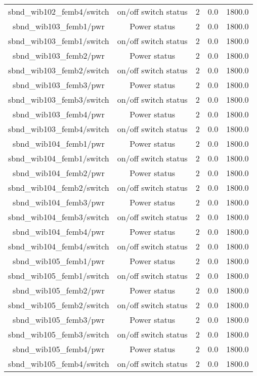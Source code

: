 \begin{center}
\begin{longtable}{c | c c c c }
sbnd\_wib102\_femb4/switch & on/off switch status & 2 & 0.0 & 1800.0\\ 
sbnd\_wib103\_femb1/pwr & Power status & 2 & 0.0 & 1800.0\\ 
sbnd\_wib103\_femb1/switch & on/off switch status & 2 & 0.0 & 1800.0\\ 
sbnd\_wib103\_femb2/pwr & Power status & 2 & 0.0 & 1800.0\\ 
sbnd\_wib103\_femb2/switch & on/off switch status & 2 & 0.0 & 1800.0\\ 
sbnd\_wib103\_femb3/pwr & Power status & 2 & 0.0 & 1800.0\\ 
sbnd\_wib103\_femb3/switch & on/off switch status & 2 & 0.0 & 1800.0\\ 
sbnd\_wib103\_femb4/pwr & Power status & 2 & 0.0 & 1800.0\\ 
sbnd\_wib103\_femb4/switch & on/off switch status & 2 & 0.0 & 1800.0\\ 
sbnd\_wib104\_femb1/pwr & Power status & 2 & 0.0 & 1800.0\\ 
sbnd\_wib104\_femb1/switch & on/off switch status & 2 & 0.0 & 1800.0\\ 
sbnd\_wib104\_femb2/pwr & Power status & 2 & 0.0 & 1800.0\\ 
sbnd\_wib104\_femb2/switch & on/off switch status & 2 & 0.0 & 1800.0\\ 
sbnd\_wib104\_femb3/pwr & Power status & 2 & 0.0 & 1800.0\\ 
sbnd\_wib104\_femb3/switch & on/off switch status & 2 & 0.0 & 1800.0\\ 
sbnd\_wib104\_femb4/pwr & Power status & 2 & 0.0 & 1800.0\\ 
sbnd\_wib104\_femb4/switch & on/off switch status & 2 & 0.0 & 1800.0\\ 
sbnd\_wib105\_femb1/pwr & Power status & 2 & 0.0 & 1800.0\\ 
sbnd\_wib105\_femb1/switch & on/off switch status & 2 & 0.0 & 1800.0\\ 
sbnd\_wib105\_femb2/pwr & Power status & 2 & 0.0 & 1800.0\\ 
sbnd\_wib105\_femb2/switch & on/off switch status & 2 & 0.0 & 1800.0\\ 
sbnd\_wib105\_femb3/pwr & Power status & 2 & 0.0 & 1800.0\\ 
sbnd\_wib105\_femb3/switch & on/off switch status & 2 & 0.0 & 1800.0\\ 
sbnd\_wib105\_femb4/pwr & Power status & 2 & 0.0 & 1800.0\\ 
sbnd\_wib105\_femb4/switch & on/off switch status & 2 & 0.0 & 1800.0\\ 

\end{longtable}
\end{center}
